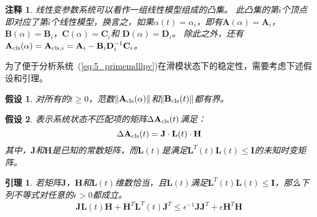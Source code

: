 \documentclass{article}
\newtheorem{remark}{注释}
\newtheorem{lemma}{引理}
\newtheorem{assumption}{假设}
\begin{document}
\begin{remark}
\label{thm:5_remark_equalonvertex}
线性变参数系统可以看作一组线性模型组成的凸集。
此凸集的第$i$个顶点即对应了第$i$个线性模型，换言之，如果$\alpha(t)=\alpha_i$，即有$\mathbf{A}(\alpha) = \mathbf{A}_{i}$，$\mathbf{B}(\alpha) = \mathbf{B}_{i}$，$\mathbf{C}(\alpha) = \mathbf{C}_{i}$和 $\mathbf{D}(\alpha)=\mathbf{D}_{i}$。
除此之外，还有$\mathbf{A}_{\rm{cls}}(\alpha)=\mathbf{A}_{{\rm{cls}},i}=\mathbf{A}_i-\mathbf{B}_i\mathbf{D}_i^{-1}\mathbf{C}_i$。
\end{remark}

为了便于分析系统~(\ref{eq:5_primemdllpv})在滑模状态下的稳定性，需要考虑下述假设和引理。
\begin{assumption}
\label{thm:5_assumption_boundary}
\cite{Pakmehr2014Gain}
对所有的$t \geq 0$，范数$\|\mathbf{A}_{\rm{cls}}(\alpha)\|$和$\|\mathbf{B}_{\rm{cls}}(t)\|$都有界。
\end{assumption}

\begin{assumption}
\label{thm:5_assumption_closeuncertainty}
\cite{Wang1992Robust}
表示系统状态不匹配项的矩阵$\Delta \mathbf{A}_{\rm{cls}}(t)$满足：
\begin{equation}
   \Delta  \mathbf{A}_{\rm{cls}}(t) = \mathbf{J} \cdot \mathbf{L}(t)\cdot \mathbf{H}
\label{eq:5_assdeltaa}
\end{equation}
其中，$\mathbf{J}$和$\mathbf{H}$是已知的常数矩阵，而$\mathbf{L}(t)$是满足$\mathbf{L}^T(t)\mathbf{L}(t) \leq \bm{I}$的未知时变矩阵。
\end{assumption}

\begin{lemma}
\label{thm:5_lemma_wangref8}
\cite{Wang1992Robust}
若矩阵$\mathbf{J}$，$\mathbf{H}$和$\mathbf{L}(t)$维数恰当，且$\mathbf{L}(t)$满足$\mathbf{L}^T(t)\mathbf{L}(t) \leq \bm{I}$，那么下列不等式对任意的$\epsilon>0$都成立。
\begin{equation}
   \mathbf{JL}(t)\mathbf{H}+\mathbf{H}^{T}\mathbf{L}^{T}(t)\mathbf{J}^{T} \leq \epsilon^{-1}\mathbf{JJ}^{T}+\epsilon \mathbf{H}^{T}\mathbf{H}
\label{eq:5_lemmainequal}
\end{equation}
\end{lemma}
\end{document}
